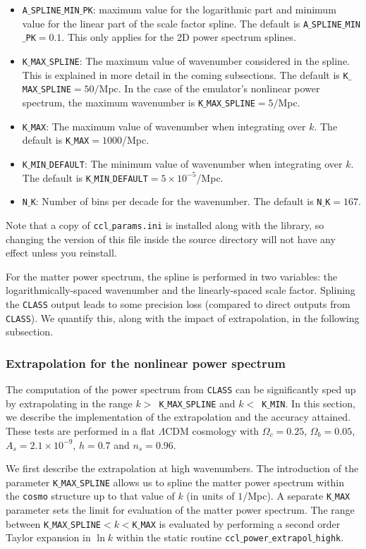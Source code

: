 \documentclass[\docopts]{\docclass}
\begin{document}
\begin{itemize}
\item {\tt A$\_$SPLINE$\_$MIN$\_$PK}: maximum value for the logarithmic part and minimum value for the linear part of the scale factor spline. The default is {\tt A$\_$SPLINE$\_$MIN$\_$PK}$=0.1$. This only applies for the 2D power spectrum splines.
\item {\tt K$\_$MAX$\_$SPLINE}: The maximum value of wavenumber considered in the spline. This is explained in more detail in the coming subsections. The default is {\tt K$\_$MAX$\_$SPLINE}$=50/$Mpc. In the case of the emulator's nonlinear power spectrum, the maximum wavenumber is {\tt K$\_$MAX$\_$SPLINE}$=5/$Mpc.
\item {\tt K$\_$MAX}: The maximum value of wavenumber when integrating over $k$. The default is {\tt K$\_$MAX}$=1000$/Mpc.
\item {\tt K$\_$MIN$\_$DEFAULT}:  The minimum value of wavenumber when integrating over $k$. The default is {\tt K$\_$MIN$\_$DEFAULT}$=5 \times 10^{-5}$/Mpc.
\item {\tt N$\_$K}: Number of bins per decade for the wavenumber. The default is {\tt N$\_$K}$=167$.
\end{itemize}
Note that a copy of {\tt ccl$\_$params.ini} is installed along with the library, so changing the version of this file inside the source directory will not have any effect unless you reinstall.

For the matter power spectrum, the spline is performed in two variables: the logarithmically-spaced wavenumber and the linearly-spaced scale factor. Splining the {\tt CLASS} output leads to some precision loss (compared to direct outputs from {\tt CLASS}). We quantify this, along with the impact of extrapolation, in the following subsection.

\subsubsection{Extrapolation for the nonlinear power spectrum}
\label{sec:NLextrapol}

The computation of the power spectrum from {\tt CLASS} can be significantly sped up by extrapolating in the range $k>$~{\tt K$\_$MAX$\_$SPLINE} and $k<$~{\tt K$\_$MIN}. In this section, we describe the implementation of the extrapolation and the accuracy attained. These tests are performed in a flat $\Lambda$CDM cosmology with $\Omega_c=0.25$, $\Omega_b=0.05$, $A_s=2.1\times10^{-9}$, $h=0.7$ and $n_s=0.96$.

We first describe the extrapolation at high wavenumbers. The introduction of the parameter {\tt K$\_$MAX$\_$SPLINE} allows us to spline the matter power spectrum within the {\tt cosmo} structure up to that value of $k$ (in units of $1/$Mpc). A separate {\tt K$\_$MAX} parameter sets the limit for evaluation of the matter power spectrum. The range between {\tt K$\_$MAX$\_$SPLINE}$<k<${\tt K$\_$MAX} is evaluated by performing a second order Taylor expansion in $\ln k$ within the static routine {\tt ccl$\_$power$\_$extrapol$\_$highk}.
\end{document}
